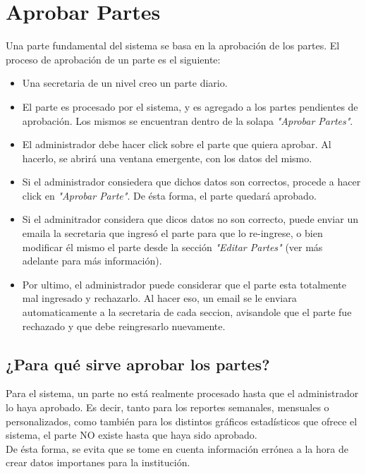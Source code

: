 \documentclass[12pt,a4paper]{article}
\begin{document}
\section{Aprobar Partes}
Una parte fundamental del sistema se basa en la aprobación de los partes. El proceso de aprobación de un parte es el siguiente:
\begin{itemize}
	\item Una secretaria de un nivel creo un parte diario.
	\item El parte es procesado por el sistema, y es agregado a los partes pendientes de aprobación. Los mismos se encuentran dentro de la solapa \textit{"Aprobar Partes"}. 
	\item El administrador debe hacer click sobre el parte que quiera aprobar. Al hacerlo, se abrirá una ventana emergente, con los datos del mismo.
	\item Si el administrador consiedera que dichos datos son correctos, procede a hacer click en \textit{"Aprobar Parte"}. De ésta forma, el parte quedará aprobado.
	\item Si el adminitrador considera que dicos datos no son correcto, puede enviar un emaila la secretaria que ingresó el parte para que lo re-ingrese, o bien modificar él mismo el parte desde la sección \textit{"Editar Partes"} (ver más adelante para más información).
	\item Por ultimo, el administrador puede considerar que el parte esta totalmente mal ingresado y rechazarlo. Al hacer eso, un email se le enviara automaticamente a la secretaria de cada seccion, avisandole que el parte fue rechazado y que debe reingresarlo nuevamente.
\end{itemize}

\subsection{¿Para qué sirve aprobar los partes?}
Para el sistema, un parte no está realmente procesado hasta que el administrador lo haya aprobado. Es decir, tanto para los reportes semanales, mensuales o personalizados, como también para los distintos gráficos estadísticos que ofrece el sistema, el parte NO existe hasta que haya sido aprobado. \\De ésta forma, se evita que se tome en cuenta información errónea a la hora de crear datos importanes para la institución.
\end{document}
